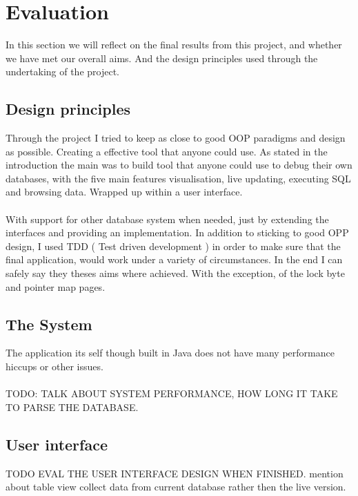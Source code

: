 \section{Evaluation}
\label{sec:evaluation}

In this section we will reflect on the final results from this project, and whether we have met our overall aims. And the design principles used through the undertaking of the project.

\subsection{Design principles}
\label{subsec:design_principles}

Through the project I tried to keep as close to good OOP paradigms and design as possible. Creating a effective tool that anyone could use. As stated in the introduction the main was to build tool that anyone could use to debug their own databases, with the five main features visualisation, live updating, executing SQL and browsing data. Wrapped up within a user interface. 
\\\\
With support for other database system when needed, just by extending the interfaces and providing an implementation. In addition to sticking to good OPP design, I used TDD ( Test driven development ) in order to make sure that the final application, would work under a variety of circumstances. In the end I can safely say they theses aims where achieved. With the exception, of the lock byte and pointer map pages. 

\subsection{The System}
\label{subsec:system_eval}

The application its self though built in Java does not have many performance hiccups or other issues. 
\\\\
TODO: TALK ABOUT SYSTEM PERFORMANCE, HOW LONG IT TAKE TO PARSE THE DATABASE.

\subsection{User interface}
\label{subsec:user_interface_eval}

TODO EVAL THE USER INTERFACE DESIGN WHEN FINISHED.
mention about table view collect data from current database rather then the live version.